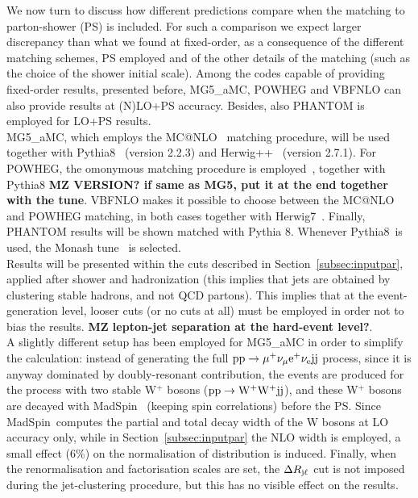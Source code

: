 We now turn to discuss how different predictions compare when the matching to parton-shower (PS) is included. For such
a comparison we expect larger discrepancy than what we found at fixed-order, as a consequence of the different
matching schemes, PS employed and of the other details of the matching (such as the choice of the shower initial scale). Among
the codes capable of providing fixed-order results, presented before, {\sc MG5\_aMC}, {\sc POWHEG} and {\sc VBFNLO}
can also provide results at (N)LO+PS accuracy. Besides, also {\sc PHANTOM} is employed for LO+PS results.\\
{\sc MG5\_aMC},
which
employs the {\sc MC@NLO}~\cite{Frixione:2002ik} matching procedure, will be used together with {\sc Pythia8}~\cite{Sjostrand:2014zea} (version 2.2.3)
and {\sc Herwig++}~\cite{Bahr:2008pv, Bellm:2013hwb} (version 2.7.1). For {\sc POWHEG}, the omonymous matching procedure is 
employed~\cite{Nason:2004rx,Frixione:2007vw}, together with {\sc Pythia8}
{\bf MZ VERSION? if same as MG5, put it at the end together with the tune}. {\sc VBFNLO} makes it possible to choose between the {\sc MC@NLO} and {\sc POWHEG}
matching, in both cases together with {\sc Herwig7}~\cite{}. Finally, {\sc PHANTOM} results will be shown matched with {\sc Pythia 8}.
Whenever {\sc Pythia8}\ is used, the Monash tune~\cite{Skands:2014pea} is selected.\\

Results will be presented within the cuts described in Section~\ref{subsec:inputpar}, applied after shower and hadronization (this implies that jets
are obtained by clustering stable hadrons, and not QCD partons). This implies that at the event-generation level, looser cuts (or no cuts at all)
must be employed in order not to bias the results. {\bf MZ lepton-jet separation at the hard-event level?}.\\

A slightly different setup has been employed for {\sc MG5\_aMC} in order to simplify the calculation: instead of generating the full
${\rm p}{\rm p}\to\mu^+\nu_\mu{\rm e}^+\nu_{\rm e}{\rm j}{\rm j}$ process, since it is anyway dominated by doubly-resonant contribution, the
events are produced for the process with two stable W$^+$ bosons (${\rm p}{\rm p}\to{\rm W^+}{\rm W^+}{\rm j}{\rm j}$), and these W$^+$ bosons
are decayed with {\sc MadSpin}~\cite{Artoisenet:2012st} (keeping spin correlations) before the PS. Since {\sc MadSpin}\ computes
the partial and total decay width of the W bosons at LO accuracy only, while in Section~\ref{subsec:inputpar} the NLO width is employed,
a small effect (6\%) on the normalisation of distribution is induced. Finally, when the renormalisation
and factorisation scales are set, the $\Delta R_{\text{j}\ell}$ cut is not imposed during the jet-clustering procedure, but this has no visible effect
on the results.

